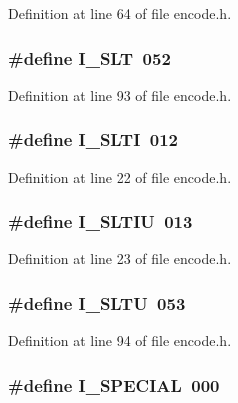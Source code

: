 Definition at line 64 of file encode.\+h.

\subsubsection[{I\+\_\+\+S\+LT}]{\setlength{\rightskip}{0pt plus 5cm}\#define I\+\_\+\+S\+LT~052}\label{encode_8h_a1981cafe761353d3f8c18651b10c5202}


Definition at line 93 of file encode.\+h.

\subsubsection[{I\+\_\+\+S\+L\+TI}]{\setlength{\rightskip}{0pt plus 5cm}\#define I\+\_\+\+S\+L\+TI~012}\label{encode_8h_ac66adfca1729c36040260d1315f05add}


Definition at line 22 of file encode.\+h.

\subsubsection[{I\+\_\+\+S\+L\+T\+IU}]{\setlength{\rightskip}{0pt plus 5cm}\#define I\+\_\+\+S\+L\+T\+IU~013}\label{encode_8h_a42b33bb895a6acf783ec78d9fa346456}


Definition at line 23 of file encode.\+h.

\subsubsection[{I\+\_\+\+S\+L\+TU}]{\setlength{\rightskip}{0pt plus 5cm}\#define I\+\_\+\+S\+L\+TU~053}\label{encode_8h_acfcf8b5dbbc44eb2e688d1ef0f2e630c}


Definition at line 94 of file encode.\+h.

\subsubsection[{I\+\_\+\+S\+P\+E\+C\+I\+AL}]{\setlength{\rightskip}{0pt plus 5cm}\#define I\+\_\+\+S\+P\+E\+C\+I\+AL~000}\label{encode_8h_aff6bdb685dfe46c115d9b2f133394c34}


